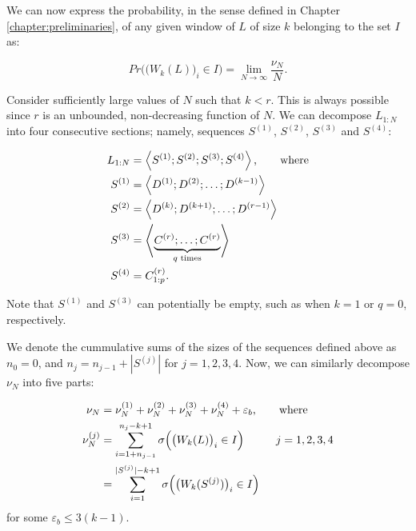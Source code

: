 \documentclass[11pt,a4paper]{tesis}
\theoremstyle{plain}
\theoremstyle{definition}
\begin{document}
We can now express the probability, in the sense defined in Chapter \ref{chapter:preliminaries}, of any given window of $L$ of size $k$ belonging to the set $I$ as:

\begin{equation*}
  Pr\Big( \big( W_k(L) \big)_i \in I \Big) = \lim_{N \to \infty} \frac{\nu_N}{N} \text{.}
\end{equation*}

Consider sufficiently large values of $N$ such that $k < r$. This is always possible since $r$ is an unbounded, non-decreasing function of $N$. We can decompose $L_{1:N}$ into four consecutive sections; namely, sequences $S^{(1)}$, $S^{(2)}$, $S^{(3)}$ and $S^{(4)}$:

\begin{equation*}
  \begin{aligned}
    L_{1:N} & = \left< S^{(1)} ; S^{(2)} ; S^{(3)} ; S^{(4)} \right> \text{, \hspace*{5mm} where} \\
    S^{(1)} & = \left< D^{(1)} ; D^{(2)} ; \dots ; D^{(k - 1)} \right> \\
    S^{(2)} & = \left< D^{(k)} ; D^{(k + 1)} ; \dots ; D^{(r - 1)} \right> \\
    S^{(3)} & = \left< \underbrace{C^{(r)} ; \dots ; C^{(r)}}_{q \text{ times}} \right> \\ 
    S^{(4)} & = C^{(r)}_{1:p} \text{.}
  \end{aligned}
\end{equation*}

Note that $S^{(1)}$ and $S^{(3)}$ can potentially be empty, such as when $k = 1$ or $q = 0$, respectively.

We denote the cummulative sums of the sizes of the sequences defined above as $n_0 = 0$, and $n_j = n_{j - 1} + |S^{(j)}|$ for $j = 1, 2, 3, 4$. Now, we can similarly decompose $\nu_N$ into five parts:

\begin{equation}\label{equation:nu-n-split-five-parts}
  \begin{aligned}
    \nu_N & = \nu^{(1)}_N + \nu^{(2)}_N + \nu^{(3)}_N + \nu^{(4)}_N + \varepsilon_b \text{, \hspace*{5mm} where} \\
    \nu^{(j)}_N & = \sum_{i = 1 + n_{j - 1}}^{n_j - k + 1} \sigma\Big( \big( W_k(L) \big)_i \in I \Big) \text{\hspace*{10mm}} j = 1, 2, 3, 4 \\
                & = \sum_{i = 1}^{|S^{(j)}| - k + 1} \sigma\Big( \big( W_k(S^{(j)}) \big)_i \in I \Big)
  \end{aligned}
\end{equation}
for some $\varepsilon_b \le 3 (k - 1)$.
\end{document}
